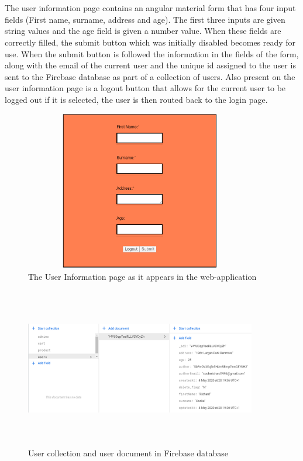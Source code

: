 \\ \\
The user information page contains an angular material form that has four input fields (First name, surname, address and age). The first three inputs are given string values and the age field is given a number value. When these fields are correctly filled, the submit button which was initially disabled becomes ready for use. When the submit button is followed the information in the fields of the form, along with the email of the current user and the unique id assigned to the user is sent to the Firebase database as part of a collection of users. Also present on the user information page is a logout button that allows for the current user to be logged out if it is selected, the user is then routed back to the login page.



\begin{figure}[h!]
    	\caption{The User Information page as it appears in the web-application}
	\centering
	\includegraphics[width=0.9\textwidth, height=7cm]{images/uinfo.png}
\end{figure}
\begin{figure}[h!]
    	\caption{User collection and user document in Firebase database}
	\centering
	\includegraphics[width=0.9\textwidth, height=7cm]{images/usercol.png}
\end{figure}

